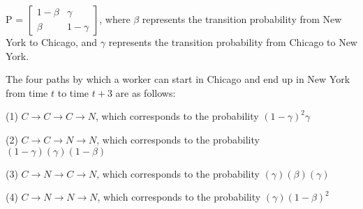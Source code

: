 \documentclass[11pt, oneside]{article}   	%
\begin{document}
P = $\begin{bmatrix} 1-\beta & \gamma \\ \beta & 1-\gamma \end{bmatrix}$, where $\beta$ represents the transition probability from New York to Chicago, and $\gamma$ represents the transition probability from Chicago to New York.

The four paths by which a worker can start in Chicago and end up in New York from time $t$ to time $t+3$ are as follows:

(1) $C\rightarrow C\rightarrow C \rightarrow N$, which corresponds to the probability $(1-\gamma)^2\gamma$

(2) $C\rightarrow C\rightarrow N \rightarrow N$, which corresponds to the probability $(1-\gamma)(\gamma)(1-\beta)$

(3) $C \rightarrow N \rightarrow C \rightarrow N$, which corresponds to the probability $(\gamma)(\beta)(\gamma)$

(4) $C \rightarrow N \rightarrow N \rightarrow N$, which corresponds to the probability $(\gamma)(1-\beta)^2$
\end{document}
